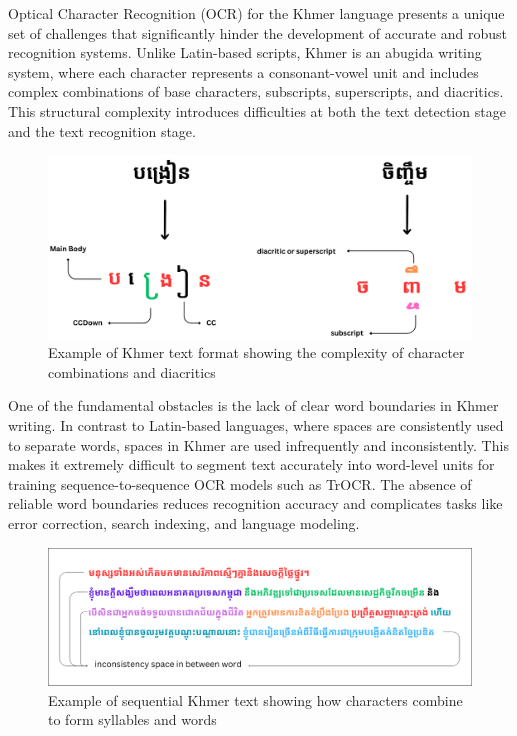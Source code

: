 Optical Character Recognition (OCR) for the Khmer language presents a 
unique set of challenges that significantly hinder the development 
of accurate and robust recognition systems. Unlike Latin-based scripts, 
Khmer is an abugida writing system, where each character represents a 
consonant-vowel unit and includes complex combinations of base 
characters, subscripts, superscripts, and diacritics. This structural 
complexity introduces difficulties at both the text detection 
stage and the text recognition stage.
\begin{figure}[ht]
    \centering
    \includegraphics[width=\textwidth]{figures/example_of_text_format.png}
    \caption{Example of Khmer text format showing the complexity of character combinations and diacritics}
    \label{fig:text_format}
\end{figure}

One of the fundamental obstacles is the lack of clear word boundaries 
in Khmer writing. In contrast to Latin-based languages, 
where spaces are consistently used to separate words, 
spaces in Khmer are used infrequently and inconsistently. 
This makes it extremely difficult to segment text accurately 
into word-level units for training sequence-to-sequence OCR models 
such as TrOCR. The absence of reliable word boundaries reduces 
recognition accuracy and complicates tasks like error correction, 
search indexing, and language modeling.

\begin{figure}[ht]
    \centering
    \includegraphics[width=\textwidth]{figures/example_of_long_text.png}
    \caption{Example of sequential Khmer text showing how characters combine to form syllables and words}
    \label{fig:sequential_text}
\end{figure}


